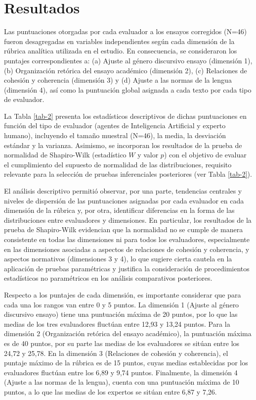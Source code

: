 \documentclass[spanish]{textolivre}
\begin{document}
\section{Resultados}
Las puntuaciones otorgadas por cada evaluador a los ensayos corregidos (N=46) fueron desagregadas en variables independientes según cada dimensión de la rúbrica analítica utilizada en el estudio. En consecuencia, se consideraron los puntajes correspondientes a: (a) Ajuste al género discursivo ensayo (dimensión 1), (b) Organización retórica del ensayo académico (dimensión 2), (c) Relaciones de cohesión y coherencia (dimensión 3) y (d) Ajuste a las normas de la lengua (dimensión 4), así como la puntuación global asignada a cada texto por cada tipo de evaluador.

La Tabla \ref{tab-2} presenta los estadísticos descriptivos de dichas puntuaciones en función del tipo de evaluador (agentes de Inteligencia Artificial y experto humano), incluyendo el tamaño muestral (N=46), la media, la desviación estándar y la varianza. Asimismo, se incorporan los resultados de la prueba de normalidad de Shapiro-Wilk (estadístico $W$ y valor $p$) con el objetivo de evaluar el cumplimiento del supuesto de normalidad de las distribuciones, requisito relevante para la selección de pruebas inferenciales posteriores (ver Tabla \ref{tab-2}).

El análisis descriptivo permitió observar, por una parte, tendencias centrales y niveles de dispersión de las puntuaciones asignadas por cada evaluador en cada dimensión de la rúbrica y, por otra, identificar diferencias en la forma de las distribuciones entre evaluadores y dimensiones. En particular, los resultados de la prueba de Shapiro-Wilk evidencian que la normalidad no se cumple de manera consistente en todas las dimensiones ni para todos los evaluadores, especialmente en las dimensiones asociadas a aspectos de relaciones de cohesión y coherencia, y aspectos normativos (dimensiones 3 y 4), lo que sugiere cierta cautela en la aplicación de pruebas paramétricas y justifica la consideración de procedimientos estadísticos no paramétricos en los análisis comparativos posteriores.

Respecto a los puntajes de cada dimensión, es importante considerar que para cada una los rangos van entre 0 y 5 puntos. La dimensión 1 (Ajuste al género discursivo ensayo) tiene una puntuación máxima de 20 puntos, por lo que las medias de los tres evaluadores fluctúan entre 12,93 y 13,24 puntos. Para la dimensión 2 (Organización retórica del ensayo académico), la puntuación máxima es de 40 puntos, por su parte las medias de los evaluadores se sitúan entre los 24,72 y 25,78. En la dimensión 3 (Relaciones de cohesión y coherencia), el puntaje máximo de la rúbrica es de 15 puntos, cuyas medias establecidas por los evaluadores fluctúan entre los 6,89 y 9,74 puntos. Finalmente, la dimensión 4 (Ajuste a las normas de la lengua), cuenta con una puntuación máxima de 10 puntos, a lo que las medias de los expertos se sitúan entre 6,87 y 7,26.
\end{document}
